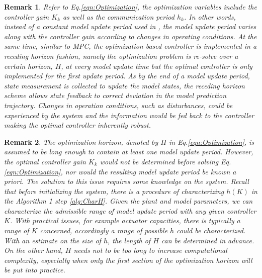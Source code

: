 \documentclass[letterpaper, 10 pt, conference]{ieeeconf}\IEEEoverridecommandlockouts%
\newtheorem{remark}{Remark}
\begin{document}
\begin{remark}
  Refer to Eq.\ref{eqn:Optimization}, the optimization variables include the controller gain $K_k$ as well as the communication period $h_k$. In other words, instead of a constant model update period used in \cite{sun2008quasi}, the model update period varies along with the controller gain according to changes in operating conditions. At the same time, similar to MPC, the optimization-based controller is implemented in a receding horizon fashion, namely the optimization problem is re-solve over a certain horizon, $H$, at every model update time but the optimal controller is only implemented for the first update period. As by the end of a model update period, state measurement is collected to update the model states, the receding horizon scheme allows state feedback to correct deviation in the model prediction trajectory. Changes in operation conditions, such as disturbances, could be experienced by the system and the information would be fed back to the controller making the optimal controller inherently robust.
\end{remark}

\begin{remark}
  The optimization horizon, denoted by $H$ in Eq.\ref{eqn:Optimization}, is assumed to be long enough to contain at least one model update period. However, the optimal controller gain $K_k$ would not be determined before solving Eq.\ref{eqn:Optimization}, nor would the resulting model update period be known a priori. The solution to this issue requires some knowledge on the system. Recall that before initializing the system, there is a procedure of characterizing $h(K)$ in the Algorithm 1 step \ref{alg:CharH}. Given the plant and model parameters, we can characterize the admissible range of model update period with any given controller $K$. With practical issues, for example actuator capacities, there is typically a range of $K$ concerned, accordingly a range of possible $h$ could be characterized. With an estimate on the size of $h$, the length of $H$ can be determined in advance. On the other hand, $H$
  needs not to be too long to increase computational complexity, especially when only the first section of the optimization horizon will be put into practice.
\end{remark}
\end{document}
